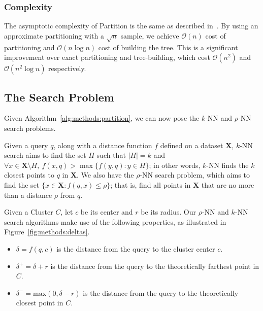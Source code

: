 \subsubsection{Complexity}
\label{sec:methods:clustering:complexity}

The asymptotic complexity of Partition is the same as described in~\cite{ishaq2019clustered}.
By using an approximate partitioning with a $\sqrt{n}$ sample, we achieve $\mathcal{O}(n)$ cost of partitioning and $\mathcal{O}(n \log n)$ cost of building the tree.
This is a significant improvement over exact partitioning and tree-building, which cost $\mathcal{O}(n^2)$ and $\mathcal{O}(n^2 \log n)$ respectively.


\subsection{The Search Problem}
\label{sec:methods:the-search-problem}

Given Algorithm~\ref{alg:methods:partition}, we can now pose the $k$-NN and $\rho$-NN search problems.

Given a query $q$, along with a distance function $f$ defined on a dataset $\textbf{X}$, $k$-NN search aims to find the set $H$ such that $|H| = k$ and $\forall x \in \textbf{X} \setminus H, \ f(x, q) > \max \{ f(y, q): y \in H \}$;
in other words, $k$-NN finds the $k$ closest points to $q$ in $\textbf{X}$.
We also have the $\rho$-NN search problem, which aims to find the set $\{x \in \textbf{X}: f(q, x) \leq \rho \}$;
that is, find all points in $\textbf{X}$ that are no more than a distance $\rho$ from $q$.

Given a Cluster $C$, let $c$ be its center and $r$ be its radius.
Our $\rho$-NN and $k$-NN search algorithms make use of the following properties, as illustrated in Figure~\ref{fig:methods:deltas}.

\begin{itemize}
    \item $\delta = f(q, c)$ is the distance from the query to the cluster center $c$.
    \item $\delta^{+} = \delta + r$ is the distance from the query to the theoretically farthest point in $C$.
    \item $\delta^{-} = \text{max}(0, \delta - r)$ is the distance from the query to the theoretically closest point in $C$.
\end{itemize}


